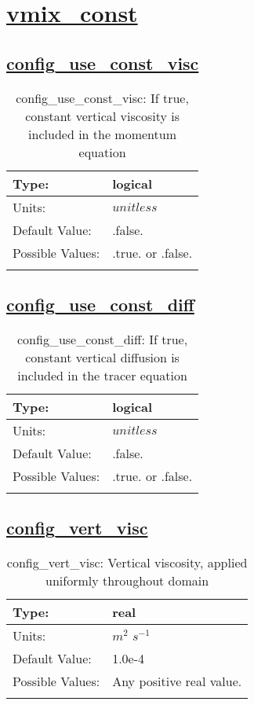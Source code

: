 \section[vmix\_const]{\hyperref[sec:nm_tab_vmix_const]{vmix\_const}}
\label{sec:nm_sec_vmix_const}
\subsection[config\_use\_const\_visc]{\hyperref[sec:nm_tab_vmix_const]{config\_use\_const\_visc}}
\label{subsec:nm_sec_config_use_const_visc}
\begin{center}
\begin{longtable}{| p{2.0in} || p{4.0in} |}
    \hline
    Type: & logical \\
    \hline
    Units: & $unitless$ \\
    \hline
    Default Value: & .false. \\
    \hline
    Possible Values: & .true. or .false. \\
    \hline
    \caption{config\_use\_const\_visc: If true, constant vertical viscosity is included in the momentum equation}
\end{longtable}
\end{center}
\subsection[config\_use\_const\_diff]{\hyperref[sec:nm_tab_vmix_const]{config\_use\_const\_diff}}
\label{subsec:nm_sec_config_use_const_diff}
\begin{center}
\begin{longtable}{| p{2.0in} || p{4.0in} |}
    \hline
    Type: & logical \\
    \hline
    Units: & $unitless$ \\
    \hline
    Default Value: & .false. \\
    \hline
    Possible Values: & .true. or .false. \\
    \hline
    \caption{config\_use\_const\_diff: If true, constant vertical diffusion is included in the tracer equation}
\end{longtable}
\end{center}
\subsection[config\_vert\_visc]{\hyperref[sec:nm_tab_vmix_const]{config\_vert\_visc}}
\label{subsec:nm_sec_config_vert_visc}
\begin{center}
\begin{longtable}{| p{2.0in} || p{4.0in} |}
    \hline
    Type: & real \\
    \hline
    Units: & $m^2$ $s^{-1}$ \\
    \hline
    Default Value: & 1.0e-4 \\
    \hline
    Possible Values: & Any positive real value. \\
    \hline
    \caption{config\_vert\_visc: Vertical viscosity, applied uniformly throughout domain}
\end{longtable}
\end{center}

